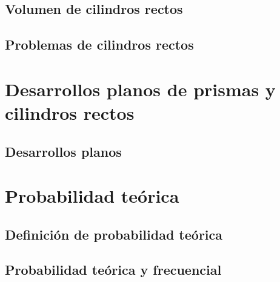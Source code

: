 \documentclass[11pt]{book}
\begin{document}
\subsection{Volumen de cilindros rectos}
\subsection{Problemas de cilindros rectos}

\section{Desarrollos planos de prismas y cilindros rectos}
\subsection{Desarrollos planos}

\section{Probabilidad teórica}
\subsection{Definición de probabilidad teórica}
\subsection{Probabilidad teórica y frecuencial}
\end{document}
